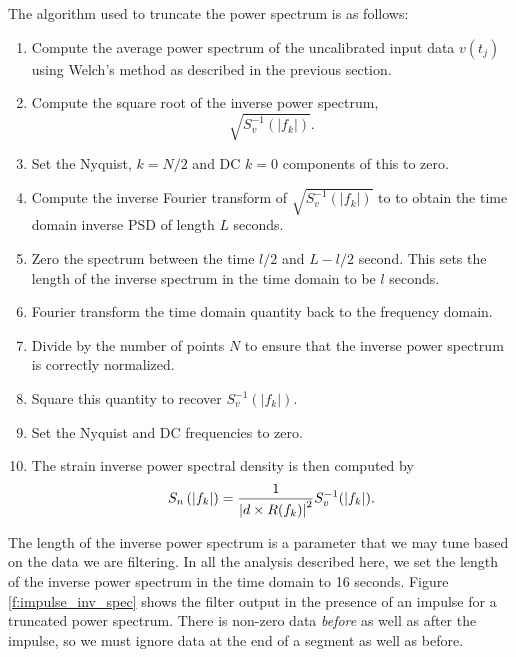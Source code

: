 The algorithm used to truncate the power spectrum is as follows:
\begin{enumerate}
\item Compute the average power spectrum of the uncalibrated input data
$v(t_j)$ using Welch's method as described in the previous section.
\item Compute the square root of the inverse power spectrum,
\begin{equation}
\sqrt{S^{-1}_v(|f_k|)}.
\end{equation}
\item Set the Nyquist, $k = N/2$ and DC $k = 0$ components of this to zero.
\item Compute the inverse Fourier transform of $\sqrt{S^{-1}_v(|f_k|)}$ to to
obtain the time domain inverse PSD of length $L$ seconds.
\item Zero the spectrum between the time $l/2$ and $L-l/2$ second. This sets
the length of the inverse spectrum in the time domain to be $l$ seconds.
\item Fourier transform the time domain quantity back to the frequency domain.
\item Divide by the number of points $N$ to ensure that the inverse power
spectrum is correctly normalized.
\item Square this quantity to recover $S^{-1}_v(|f_k|)$.
\item Set the Nyquist and DC frequencies to zero.
\item The strain inverse power spectral density is then computed by
\begin{equation}
S_n\left(\left|f_{k}\right|\right) = \frac{1}{\left|d \times R(f_k)\right|^2} S^{-1}_v(|f_k|).
\end{equation}
\end{enumerate}
The length of the inverse power spectrum is a parameter that we may tune based
on the data we are filtering. In all the analysis described here, we set the
length of the inverse power spectrum in the time domain to 16 seconds.
Figure \ref{f:impulse_inv_spec} shows the filter output in the presence of an
impulse for a truncated power spectrum. There is non-zero data \emph{before}
as well as after the impulse, so we must ignore data at the end of a segment
as well as before.

